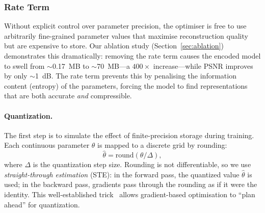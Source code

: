 \documentclass[11pt,a4paper]{article}
\begin{document}
\subsubsection{Rate Term}

Without explicit control over parameter precision, the optimiser is free to use arbitrarily fine-grained parameter values that maximise reconstruction quality but are expensive to store.  Our ablation study (Section~\ref{sec:ablation}) demonstrates this dramatically: removing the rate term causes the encoded model to swell from $\sim$0.17~MB to $\sim$70~MB---a $400\times$ increase---while PSNR improves by only $\sim$1~dB.  The rate term prevents this by penalising the information content (entropy) of the parameters, forcing the model to find representations that are both accurate \emph{and} compressible.

\paragraph{Quantization.}
The first step is to simulate the effect of finite-precision storage during training.  Each continuous parameter $\theta$ is mapped to a discrete grid by rounding:
\begin{equation}
\widehat{\theta} = \mathrm{round}(\theta/\Delta),
\label{eq:quantization}
\end{equation}
where $\Delta$ is the quantization step size.  Rounding is not differentiable, so we use \emph{straight-through estimation} (STE): in the forward pass, the quantized value $\widehat{\theta}$ is used; in the backward pass, gradients pass through the rounding as if it were the identity.  This well-established trick~\cite{balle2017end} allows gradient-based optimisation to ``plan ahead'' for quantization.
\end{document}
